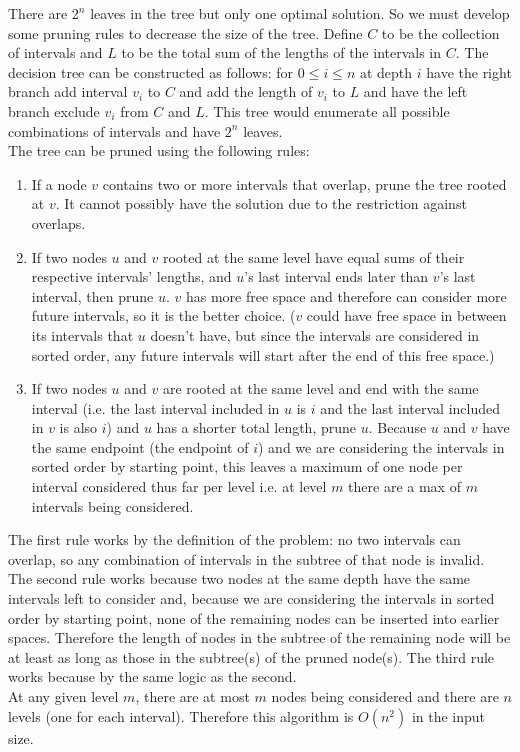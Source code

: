 \documentclass[letterpaper,notitlepage,twoside]{article}
\begin{document}
There are $2^n$ leaves in the tree but only one optimal solution. So we must develop some pruning rules to decrease the size of the tree.
Define $C$ to be the collection of intervals and $L$ to be the total sum of the lengths of the intervals in $C$. 
The decision tree can be constructed as follows: for $0 \leq i \leq n$ at depth $i$ have the right branch add interval $v_i$ to $C$ and add the length of $v_i$ to $L$ and have the left branch exclude $v_i$ from $C$ and $L$. This tree would enumerate all possible combinations of intervals and have $2^n$ leaves. \\
The tree can be pruned using the following rules:
\begin{enumerate}
\item If a node $v$ contains two or more intervals that overlap, prune the tree rooted at $v$. It cannot possibly have the solution due to the restriction against overlaps.
\item If two nodes $u$ and $v$ rooted at the same level have equal sums of their respective intervals' lengths, and $u$'s last interval ends later than $v$'s last interval, then prune $u$. $v$ has more free space and therefore can consider more future intervals, so it is the better choice. ($v$ could have free space in between its intervals that $u$ doesn't have, but since the intervals are considered in sorted order, any future intervals will start after the end of this free space.) 
\item If two nodes $u$ and $v$ are rooted at the same level and end with the same interval (i.e. the last interval included in $u$ is $i$ and the last interval included in $v$ is also $i$) and $u$ has a shorter total length, prune $u$. Because $u$ and $v$ have the same endpoint (the endpoint of $i$) and we are considering the intervals in sorted order by starting point, this leaves a maximum of one node per interval considered thus far per level i.e. at level $m$ there are a max of $m$ intervals being considered. 
\end{enumerate}
The first rule works by the definition of the problem: no two intervals can overlap, so any combination of intervals in the subtree of that node is invalid. The second rule works because two nodes at the same depth have the same intervals left to consider and, because we are considering the intervals in sorted order by starting point, none of the remaining nodes can be inserted into earlier spaces. Therefore the length of nodes in the subtree of the remaining node will be at least as long as those in the subtree(s) of the pruned node(s). The third rule works because by the same logic as the second. \\
At any given level $m$, there are at most $m$ nodes being considered and there are $n$ levels (one for each interval). Therefore this algorithm is $O(n^2)$ in the input size.\\
\end{document}
